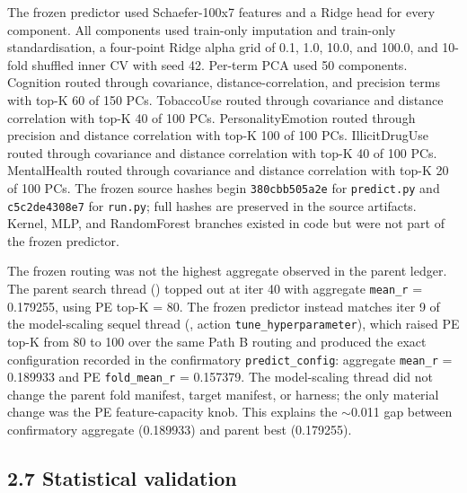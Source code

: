\documentclass[11pt,letterpaper]{report}
\begin{document}
The frozen predictor used Schaefer-100x7 features and a Ridge head for every component. All components used train-only imputation and train-only standardisation, a four-point Ridge alpha grid of 0.1, 1.0, 10.0, and 100.0, and 10-fold shuffled inner CV with seed 42. Per-term PCA used 50 components. Cognition routed through covariance, distance-correlation, and precision terms with top-K 60 of 150 PCs. TobaccoUse routed through covariance and distance correlation with top-K 40 of 100 PCs. PersonalityEmotion routed through precision and distance correlation with top-K 100 of 100 PCs. IllicitDrugUse routed through covariance and distance correlation with top-K 40 of 100 PCs. MentalHealth routed through covariance and distance correlation with top-K 20 of 100 PCs. The frozen source hashes begin \texttt{380cbb505a2e} for \texttt{predict.py} and \texttt{c5c2de4308e7} for \texttt{run.py}; full hashes are preserved in the source artifacts. Kernel, MLP, and RandomForest branches existed in code but were not part of the frozen predictor.

The frozen routing was not the highest aggregate observed in the parent ledger. The parent search thread () topped out at iter 40 with aggregate \texttt{mean\_r} = 0.179255, using PE top-K = 80. The frozen predictor instead matches iter 9 of the model-scaling sequel thread (, action \texttt{tune\_hyperparameter}), which raised PE top-K from 80 to 100 over the same Path B routing and produced the exact configuration recorded in the confirmatory \texttt{predict\_config}: aggregate \texttt{mean\_r} = 0.189933 and PE \texttt{fold\_mean\_r} = 0.157379. The model-scaling thread did not change the parent fold manifest, target manifest, or harness; the only material change was the PE feature-capacity knob. This explains the $\sim$0.011 gap between confirmatory aggregate (0.189933) and parent best (0.179255).

\subsection*{2.7 Statistical validation}
\end{document}

